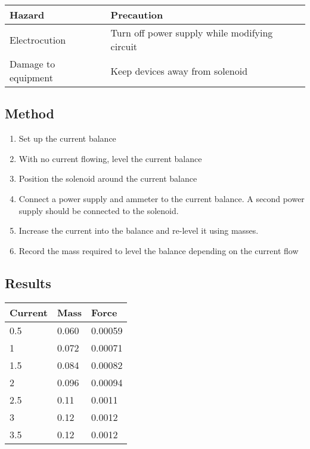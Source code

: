 		\begin{table}[htbp]
			\centering
			\begin{tabular}{l|l}
				Hazard			& Precaution \\ \hline
				Electrocution		& Turn off power supply while modifying circuit \\
				Damage to equipment	& Keep devices away from solenoid
			\end{tabular}
		\end{table}

	\subsection{Method}
		\begin{enumerate}
			\item Set up the current balance
			\item With no current flowing, level the current balance
			\item Position the solenoid around the current balance
			\item Connect a power supply and ammeter to the current balance. A second power supply should be connected to the solenoid.
			\item Increase the current into the balance and re-level it using masses.
			\item Record the mass required to level the balance depending on the current flow
		\end{enumerate}
	
	\subsection{Results}
		\begin{table}[htbp]
			\centering
			\begin{tabular}{l|l|l}
				Current	& Mass	& Force \\ \hline
				0.5 	& 0.060	& 0.00059	\\
				1	& 0.072	& 0.00071	\\
				1.5	& 0.084	& 0.00082	\\
				2	& 0.096	& 0.00094	\\
				2.5	& 0.11	& 0.0011	\\
				3	& 0.12	& 0.0012	\\
				3.5	& 0.12	& 0.0012
			\end{tabular}
		\end{table}

